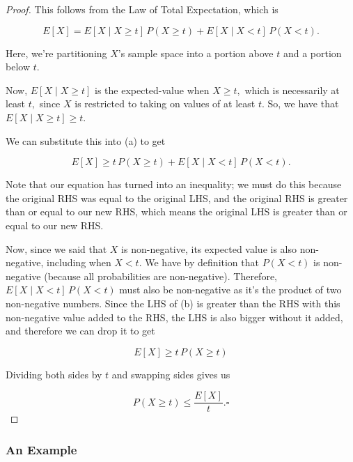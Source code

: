 \documentclass{article}
\begin{document}
\begin{proof}
This follows from the Law of Total \@{Expectation}, which is

\[ E[X] = E[X \mid X \ge t]\,P(X \ge t) + E[X \mid X < t]\,P(X < t). \tag{a} \]

Here, we're partitioning $X$'s \@{sample space} into a portion above $t$ and a portion below $t.$

Now, $E[X \mid X \ge t]$ is the \@{expected-value} when $X \ge t,$ which is necessarily at least $t,$ since $X$ is restricted to taking on values of at least $t.$ So, we have that $E[X \mid X \ge t] \ge t.$

We can substitute this into (a) to get

\[ E[X] \geq t\,P(X \ge t) + E[X \mid X < t]\,P(X < t). \tag{b} \]

Note that our equation has turned into an inequality; we must do this because the original RHS was equal to the original LHS, and the original RHS is greater than or equal to our new RHS, which means the original LHS is greater than or equal to our new RHS.

Now, since we said that $X$ is \@{non-negative}, its expected value is also non-negative, including when $X < t.$ We have by definition that $P(X < t)$ is non-negative (because all \@{probabilities} are non-negative). Therefore, $E[X \mid X < t]\,P(X < t)$ must also be non-negative as it's the product of two non-negative numbers. Since the LHS of (b) is greater than the RHS with this non-negative value added to the RHS, the LHS is also bigger without it added, and therefore we can drop it to get

\[ E[X] \geq t\,P(X \ge t) \tag{c} \]

Dividing both sides by $t$ and swapping sides gives us

\[ P(X \geq t) \leq \frac{E[X]}{t}. \square \]
\end{proof}

\subsubsection{An Example}
\end{document}
